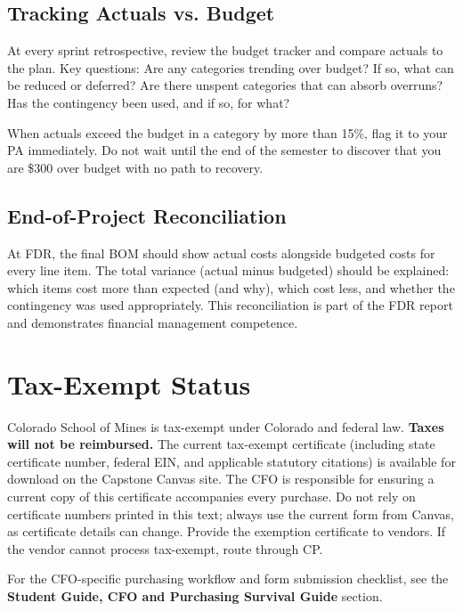 \subsection{Tracking Actuals vs. Budget}
At every sprint retrospective, review the budget tracker and compare actuals to the plan. Key questions: Are any categories trending over budget? If so, what can be reduced or deferred? Are there unspent categories that can absorb overruns? Has the contingency been used, and if so, for what?

When actuals exceed the budget in a category by more than 15\%, flag it to your PA immediately. Do not wait until the end of the semester to discover that you are \$300 over budget with no path to recovery.

\subsection{End-of-Project Reconciliation}
At FDR, the final BOM should show actual costs alongside budgeted costs for every line item. The total variance (actual minus budgeted) should be explained: which items cost more than expected (and why), which cost less, and whether the contingency was used appropriately. This reconciliation is part of the FDR report and demonstrates financial management competence.

\section{Tax-Exempt Status}
Colorado School of Mines is tax-exempt under Colorado and federal law. \textbf{Taxes will not be reimbursed.} The current tax-exempt certificate (including state certificate number, federal EIN, and applicable statutory citations) is available for download on the Capstone Canvas site. The CFO is responsible for ensuring a current copy of this certificate accompanies every purchase. Do not rely on certificate numbers printed in this text; always use the current form from Canvas, as certificate details can change. Provide the exemption certificate to vendors. If the vendor cannot process tax-exempt, route through CP.


\begin{tipbox}
For the CFO-specific purchasing workflow and form submission checklist, see the \textbf{Student Guide, CFO and Purchasing Survival Guide} section.
\end{tipbox}

